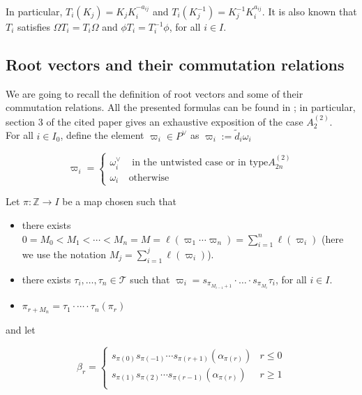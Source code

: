 \documentclass[12pt]{amsart}
\numberwithin{equation}{section}
\newcommand{\Z}{\ensuremath{\mathbb{Z}}}
\newcommand{\mc}[1]{\mathcal{#1}}
\begin{document}
\vspace{3mm}

In particular, $T_i(K_j) = K_jK_i^{-a_{ij}}$ and $T_i(K_j^{-1}) = K_j^{-1}K_i^{a_{ij}}$. It is also known that $T_i$ satisfies $\Omega T_i = T_i\Omega$ and $\phi T_i = T_i^{-1}\phi$, for all $i\in I$.

\subsection{Root vectors and their commutation relations}

We are going to recall the definition of root vectors and some of their commutation relations. All the presented formulas can be found in \cite{D}; in particular, section 3 of the cited paper gives an exhaustive exposition of the case $A_2^{(2)}$. \\

For all $i \in I_0$, define the element $\varpi_i \in P^{\vee}$ as $\varpi_i := \tilde{d}_i\omega_i$

$$ \varpi_i =  \begin{cases} \omega_i^{\vee} & \mbox{ in the untwisted case or in type} A_{2n}^{(2)} \\
\omega_i & \mbox{otherwise}   
\end{cases}$$

Let $\pi : \Z \to I$ be a map chosen such that

\begin{itemize}
    \item there exists $0 = M_0 < M_1 < \cdots < M_n = M = \ell(\varpi_1\cdots\varpi_n) = \sum_{i=1}^n \ell(\varpi_i) $ (here we use the notation $M_j = \sum_{i=1}^j \ell(\varpi_i)$).
    \item there exists $\tau_i, \ldots, \tau_n \in \mc{T}$ such that $\varpi_i = s_{\pi_{M_{i-1} + 1}} \cdot \ldots \cdot s_{\pi_{M_i}}\tau_i$, for all $i\in I$.
    \item $\pi_{r + M_n} = \tau_1\cdot\cdots\cdot\tau_n(\pi_r)$
\end{itemize}

and let

$$ \beta_r = \begin{cases}
    s_{\pi(0)}s_{\pi(-1)} \cdots s_{\pi(r+1)}(\alpha_{\pi(r)}) & r\leq 0 \\
    s_{\pi(1)}s_{\pi(2)} \cdots s_{\pi(r-1)}(\alpha_{\pi(r)}) & r \geq 1 \\
\end{cases}  $$ 

\vspace{0.3cm}
\end{document}

